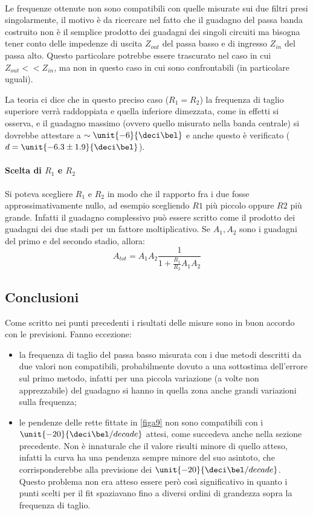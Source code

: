 \documentclass[10pt,a4paper]{article}
\begin{document}
\paragraph{}
Le frequenze ottenute non sono compatibili con quelle misurate sui due filtri presi singolarmente, il motivo è da ricercare nel fatto che il guadagno del passa banda costruito non è il semplice prodotto dei guadagni dei singoli circuiti ma bisogna tener conto delle impedenze di uscita $Z_{out}$ del passa basso e di ingresso $Z_{in}$ del passa alto. Questo particolare potrebbe essere trascurato nel caso in cui $Z_{out} << Z_{in}$, ma non in questo caso in cui sono confrontabili (in particolare uguali).

La teoria ci dice che in questo preciso caso ($R_1 = R_2$) la frequenza di taglio superiore verrà raddoppiata e quella inferiore dimezzata, come in effetti si osserva, e il guadagno massimo (ovvero quello misurato nella banda centrale) si dovrebbe attestare a $\sim \unit{-6}{\deci\bel}$ e anche questo è verificato ($d=\unit{-6.3 \pm 1.9}{\deci\bel}$).

\paragraph{Scelta di $R_1$ e $R_2$} Si poteva scegliere $R_1$ e $R_2$ in modo che il rapporto fra i due fosse approssimativamente nullo, ad esempio scegliendo $R1$ più piccolo oppure $R2$ più grande.
Infatti il guadagno complessivo può essere scritto come il prodotto dei guadagni dei due stadi per un fattore moltiplicativo. Se $A_1, A_2$ sono i guadagni del primo e del secondo stadio, allora:
\begin{equation*}
A_{tot} = A_1 A_2 \frac{1}{1 + \frac{R_1}{R_2} A_1 A_2}
\end{equation*}

\subsection{Conclusioni}
Come scritto nei punti precedenti i risultati delle misure sono in buon accordo con le previsioni.
Fanno eccezione:
\begin{itemize}
	\item la frequenza di taglio del passa basso misurata con i due metodi descritti da due valori non compatibili, probabilmente dovuto a una sottostima dell'errore sul primo metodo, infatti per una piccola variazione (a volte non apprezzabile) del guadagno si hanno in quella zona anche grandi variazioni sulla frequenza;
	\item le pendenze delle rette fittate in \figurename{\ref{figa9}} non sono compatibili con i $\unit{-20}{\deci\bel/decade}$ attesi, come succedeva anche nella sezione precedente. Non è innaturale che il valore risulti minore di quello atteso, infatti la curva ha una pendenza sempre minore del suo asintoto, che corrisponderebbe alla previsione dei $\unit{-20}{\deci\bel/decade}$. Questo problema non era atteso essere però così significativo in quanto i punti scelti per il fit spaziavano fino a diversi ordini di grandezza sopra la frequenza di taglio.
\end{itemize}
\end{document}

